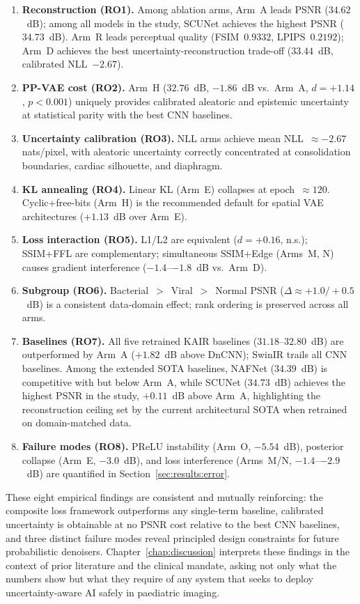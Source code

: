 \documentclass[12pt, a4paper, twoside, openright]{book}
\begin{document}
\begin{enumerate}
\item \textbf{Reconstruction (RO1).} Among ablation arms, Arm~A leads PSNR ($34.62$~dB); among all models in the study, SCUNet achieves the highest PSNR ($34.73$~dB). Arm~R leads perceptual quality (FSIM~$0.9332$, LPIPS~$0.2192$); Arm~D achieves the best uncertainty-reconstruction trade-off ($33.44$~dB, calibrated NLL~$-2.67$).
\item \textbf{PP-VAE cost (RO2).} Arm~H ($32.76$~dB, $-1.86$~dB vs.\ Arm~A, $d=+1.14$, $p<0.001$) uniquely provides calibrated aleatoric and epistemic uncertainty at statistical parity with the best CNN baselines.
\item \textbf{Uncertainty calibration (RO3).} NLL arms achieve mean NLL~$\approx-2.67$ nats/pixel, with aleatoric uncertainty correctly concentrated at consolidation boundaries, cardiac silhouette, and diaphragm.
\item \textbf{KL annealing (RO4).} Linear KL (Arm~E) collapses at epoch~$\approx120$. Cyclic+free-bits (Arm~H) is the recommended default for spatial VAE architectures ($+1.13$~dB over Arm~E).
\item \textbf{Loss interaction (RO5).} L1/L2 are equivalent ($d=+0.16$, n.s.); SSIM+FFL are complementary; simultaneous SSIM+Edge (Arms~M, N) causes gradient interference ($-1.4$--$-1.8$~dB vs.\ Arm~D).
\item \textbf{Subgroup (RO6).} Bacterial~$>$~Viral~$>$~Normal PSNR ($\Delta\approx+1.0/+0.5$~dB) is a consistent data-domain effect; rank ordering is preserved across all arms.
\item \textbf{Baselines (RO7).} All five retrained KAIR baselines ($31.18$--$32.80$~dB) are outperformed by Arm~A ($+1.82$~dB above DnCNN); SwinIR trails all CNN baselines. Among the extended SOTA baselines, NAFNet ($34.39$~dB) is competitive with but below Arm~A, while SCUNet ($34.73$~dB) achieves the highest PSNR in the study, $+0.11$~dB above Arm~A, highlighting the reconstruction ceiling set by the current architectural SOTA when retrained on domain-matched data.
\item \textbf{Failure modes (RO8).} PReLU instability (Arm~O, $-5.54$~dB), posterior collapse (Arm~E, $-3.0$~dB), and loss interference (Arms~M/N, $-1.4$--$-2.9$~dB) are quantified in Section~\ref{sec:results:error}.
\end{enumerate}

These eight empirical findings are consistent and mutually reinforcing: the composite loss framework outperforms any single-term baseline, calibrated uncertainty is obtainable at no PSNR cost relative to the best CNN baselines, and three distinct failure modes reveal principled design constraints for future probabilistic denoisers. Chapter~\ref{chap:discussion} interprets these findings in the context of prior literature and the clinical mandate, asking not only what the numbers show but what they require of any system that seeks to deploy uncertainty-aware AI safely in paediatric imaging.
\end{document}
